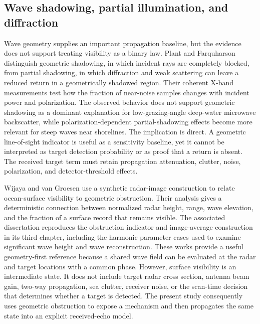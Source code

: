 \documentclass[10pt,letterpaper]{article}
\begin{document}
\subsection{Wave shadowing, partial illumination, and diffraction}

Wave geometry supplies an important propagation baseline, but the evidence does not support treating visibility as a binary law. Plant and Farquharson distinguish geometric shadowing, in which incident rays are completely blocked, from partial shadowing, in which diffraction and weak scattering can leave a reduced return in a geometrically shadowed region. Their coherent X-band measurements test how the fraction of near-noise samples changes with incident power and polarization. The observed behavior does not support geometric shadowing as a dominant explanation for low-grazing-angle deep-water microwave backscatter, while polarization-dependent partial-shadowing effects become more relevant for steep waves near shorelines. \cite{Plant2012WaveShadowing} The implication is direct. A geometric line-of-sight indicator is useful as a sensitivity baseline, yet it cannot be interpreted as target detection probability or as proof that a return is absent. The received target term must retain propagation attenuation, clutter, noise, polarization, and detector-threshold effects.

Wijaya and van Groesen use a synthetic radar-image construction to relate ocean-surface visibility to geometric obstruction. Their analysis gives a deterministic connection between normalized radar height, range, wave elevation, and the fraction of a surface record that remains visible. \cite{Wijaya2016Shadowing} The associated dissertation reproduces the obstruction indicator and image-average construction in its third chapter, including the harmonic parameter cases used to examine significant wave height and wave reconstruction. \cite{Wijaya2017Reconstruction} These works provide a useful geometry-first reference because a shared wave field can be evaluated at the radar and target locations with a common phase. However, surface visibility is an intermediate state. It does not include target radar cross section, antenna beam gain, two-way propagation, sea clutter, receiver noise, or the scan-time decision that determines whether a target is detected. The present study consequently uses geometric obstruction to expose a mechanism and then propagates the same state into an explicit received-echo model.
\end{document}

